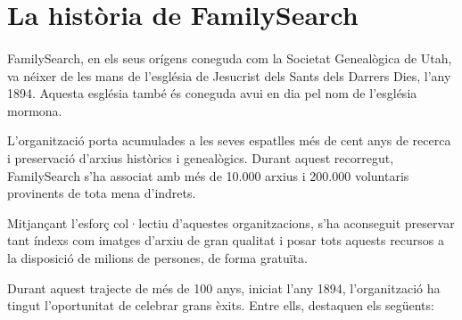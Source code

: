 \section{La història de FamilySearch}

    \paragraph{}
    FamilySearch, en els seus orígens coneguda com la Societat Genealògica de Utah, va néixer de les mans de l'església de Jesucrist dels Sants dels Darrers Dies, l'any 1894. Aquesta església també és coneguda avui en dia pel nom de l'església mormona.

    L'organització porta acumulades a les seves espatlles més de cent anys de recerca i preservació d'arxius històrics i genealògics. Durant aquest recorregut, FamilySearch s'ha associat amb més de 10.000 arxius i 200.000 voluntaris provinents de tota mena d'indrets.

    Mitjançant l’esforç col·lectiu d’aquestes organitzacions, s’ha aconseguit preservar tant índexs com imatges d’arxiu de gran qualitat i posar tots aquests recursos a la disposició de milions de persones, de forma gratuïta.

    Durant aquest trajecte de més de 100 anys, iniciat l'any 1894, l'organització ha tingut l'oportunitat de celebrar grans èxits. Entre ells, destaquen els següents:

